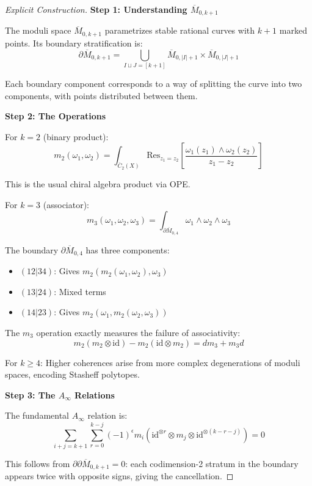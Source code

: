 \begin{proof}[Explicit Construction]
\textbf{Step 1: Understanding $\overline{M}_{0,k+1}$}

The moduli space $\overline{M}_{0,k+1}$ parametrizes stable rational curves with 
$k+1$ marked points. Its boundary stratification is:
$$\partial \overline{M}_{0,k+1} = \bigcup_{I \sqcup J = [k+1]} 
\overline{M}_{0,|I|+1} \times \overline{M}_{0,|J|+1}$$

Each boundary component corresponds to a way of splitting the curve into two 
components, with points distributed between them.

\textbf{Step 2: The Operations}

For $k=2$ (binary product):
$$m_2(\omega_1, \omega_2) = \int_{\overline{C}_2(X)} 
\text{Res}_{z_1=z_2}\left[\frac{\omega_1(z_1) \wedge \omega_2(z_2)}{z_1-z_2}\right]$$

This is the usual chiral algebra product via OPE.

For $k=3$ (associator):
$$m_3(\omega_1, \omega_2, \omega_3) = 
\int_{\partial \overline{M}_{0,4}} \omega_1 \wedge \omega_2 \wedge \omega_3$$

The boundary $\partial \overline{M}_{0,4}$ has three components:
\begin{itemize}
\item $(12|34)$: Gives $m_2(m_2(\omega_1,\omega_2),\omega_3)$
\item $(13|24)$: Mixed terms
\item $(14|23)$: Gives $m_2(\omega_1,m_2(\omega_2,\omega_3))$
\end{itemize}

The $m_3$ operation exactly measures the failure of associativity:
$$m_2(m_2 \otimes \text{id}) - m_2(\text{id} \otimes m_2) = d m_3 + m_3 d$$

For $k \geq 4$: Higher coherences arise from more complex degenerations of moduli 
spaces, encoding Stasheff polytopes.

\textbf{Step 3: The $A_\infty$ Relations}

The fundamental $A_\infty$ relation is:
$$\sum_{i+j=k+1} \sum_{r=0}^{k-j} (-1)^{\epsilon} 
m_i(\text{id}^{\otimes r} \otimes m_j \otimes \text{id}^{\otimes (k-r-j)}) = 0$$

This follows from $\partial \partial \overline{M}_{0,k+1} = 0$: each codimension-2 
stratum in the boundary appears twice with opposite signs, giving the cancellation.
\end{proof}

